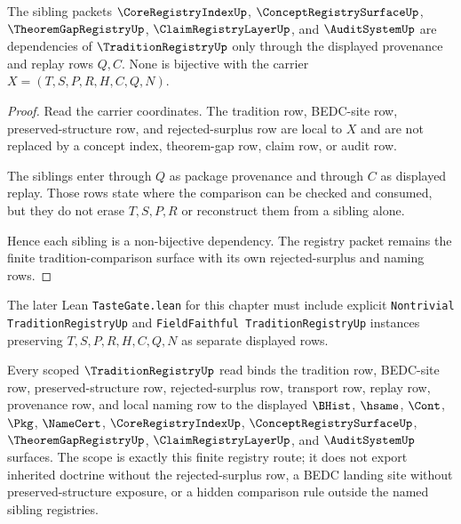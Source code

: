 \begin{theorem}
\label{thm:tradition-registry-sibling-dependency}
The sibling packets $\CoreRegistryIndexUp$, $\ConceptRegistrySurfaceUp$, $\TheoremGapRegistryUp$, $\ClaimRegistryLayerUp$, and $\AuditSystemUp$ are dependencies of $\TraditionRegistryUp$ only through the displayed provenance and replay rows $Q,C$. None is bijective with the carrier $X=(T,S,P,R,H,C,Q,N)$.
\end{theorem}
\begin{proof}
Read the carrier coordinates. The tradition row, BEDC-site row, preserved-structure row, and rejected-surplus row are local to $X$ and are not replaced by a concept index, theorem-gap row, claim row, or audit row.

The siblings enter through $Q$ as package provenance and through $C$ as displayed replay. Those rows state where the comparison can be checked and consumed, but they do not erase $T,S,P,R$ or reconstruct them from a sibling alone.

Hence each sibling is a non-bijective dependency. The registry packet remains the finite tradition-comparison surface with its own rejected-surplus and naming rows.
\end{proof}



The later Lean \texttt{TasteGate.lean} for this chapter must include explicit \texttt{Nontrivial TraditionRegistryUp} and \texttt{FieldFaithful TraditionRegistryUp} instances preserving $T,S,P,R,H,C,Q,N$ as separate displayed rows.

\begin{theorem}
\label{thm:tradition-registry-scoped-dependency-rows}
Every scoped $\TraditionRegistryUp$ read binds the tradition row, BEDC-site row, preserved-structure row, rejected-surplus row, transport row, replay row, provenance row, and local naming row to the displayed $\BHist$, $\hsame$, $\Cont$, $\Pkg$, $\NameCert$, $\CoreRegistryIndexUp$, $\ConceptRegistrySurfaceUp$, $\TheoremGapRegistryUp$, $\ClaimRegistryLayerUp$, and $\AuditSystemUp$ surfaces. The scope is exactly this finite registry route; it does not export inherited doctrine without the rejected-surplus row, a BEDC landing site without preserved-structure exposure, or a hidden comparison rule outside the named sibling registries.
\end{theorem}

